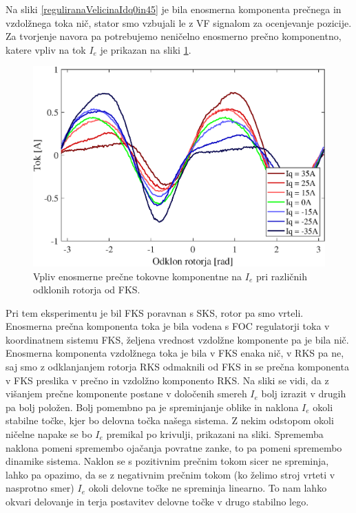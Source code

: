 \documentclass[a4paper,twoside,openright,12pt,slovene]{book}
\begin{document}
Na sliki \ref{reguliranaVelicinaIdq0in45} je bila enosmerna komponenta prečnega in vzdolžnega toka nič, stator smo vzbujali le z VF signalom za ocenjevanje pozicije. Za tvorjenje navora pa potrebujemo
neničelno enosmerno prečno komponentno, katere vpliv na tok $I_e$ je prikazan na sliki \ref{reguliranaVelicinaIs}. 
\newline
\begin{figure}[!htbp]
    \centering
    \includegraphics[width=0.85\columnwidth]{Slike/reguliranaVelicinaIs.eps}
    \caption{\label{reguliranaVelicinaIs} Vpliv enosmerne prečne tokovne komponentne na $I_e$ pri različnih odklonih rotorja od FKS.}
\end{figure}

Pri tem eksperimentu je bil FKS poravnan s SKS, rotor pa smo vrteli. Enosmerna prečna komponenta toka je bila vodena s FOC regulatorji toka v koordinatnem sistemu FKS, željena vrednost vzdolžne
komponente pa je bila nič. Enosmerna komponenta vzdolžnega toka je bila v FKS enaka nič, v RKS pa ne, saj smo z odklanjanjem rotorja RKS odmaknili od FKS in se prečna komponenta v FKS preslika v
prečno in vzdolžno komponento RKS. Na sliki se vidi, da z višanjem prečne komponente postane v določenih smereh $I_e$ bolj izrazit v drugih pa bolj položen. Bolj pomembno pa je spreminjanje oblike in
naklona $I_e$ okoli stabilne točke, kjer bo delovna točka našega sistema. Z nekim odstopom okoli ničelne napake se bo $I_e$ premikal po krivulji, prikazani na sliki. Sprememba naklona pomeni spremembo
ojačanja povratne zanke, to pa pomeni spremembo dinamike sistema. Naklon se s pozitivnim prečnim tokom sicer ne spreminja, lahko pa opazimo, da se z negativnim prečnim tokom (ko želimo stroj vrteti v
nasprotno smer) $I_e$ okoli delovne točke ne spreminja linearno. To nam lahko okvari delovanje in terja postavitev delovne točke v drugo stabilno lego.
\end{document}
